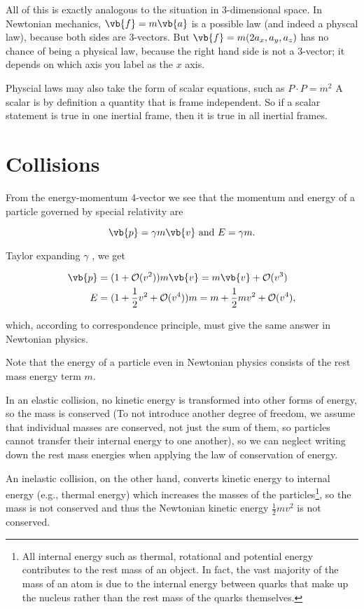 \documentclass[english,a4paper,12pt]{report}
\begin{document}
All of this is exactly analogous to the situation in 3-dimensional space. In Newtonian mechanics, \(\vb{f}  = m\vb{a} \) is a possible law (and indeed a physcal law), because both sides are 3-vectors. But \(\vb{f} = m(2a_{x}, a_{y},a_{z})\) has no chance of being a physical law, because the right hand side is not a 3-vector; it depends on which axis you label as the \(x\) axis.

Physcial laws may also take the form of scalar equations, such as \(P \cdot P = m^2\) A scalar is by definition a quantity that is frame independent. So if a scalar statement is true in one inertial frame, then it is true in all inertial frames.  

\section{Collisions}

From the energy-momentum 4-vector we see that the momentum and energy of a particle governed by special relativity are

\begin{equation}
    \vb{p}  = \gamma m\vb{v} \text { and } E = \gamma m.
\end{equation}

Taylor expanding \(\gamma \) , we get

\begin{equation}
    \begin{aligned}
    \vb{p} &= (1 + \mathcal{O}(v^2)) m\vb{v} = m\vb{v} + \mathcal{O}(v^3 ) \\
    E &= (1 + \frac{1}{2}v^2 + \mathcal{O}(v^{4} ) ) m = m + \frac{1}{2}mv^2 + \mathcal{O}(v^{4} ), 
    \end{aligned}
\end{equation}

which, according to correspondence principle, must give the same answer in Newtonian physics. 

Note that the energy of a particle even in Newtonian physics consists of the rest mass energy term \(m\).  

In an elastic collision, no kinetic energy is transformed into other forms of energy, so the mass is conserved (To not introduce another degree of freedom, we assume that individual masses are conserved, not just the sum of them, so particles cannot transfer their internal energy to one another), so we can neglect writing down the rest mass energies when applying the law of conservation of energy.

An inelastic collision, on the other hand, converts kinetic energy to internal energy (e.g., thermal energy) which increases the masses of the particles\footnote{All internal energy such as thermal, rotational and potential energy contributes to the rest mass of an object. In fact, the vast majority of the mass of an atom is due to the internal energy between quarks that make up the nucleus rather than the rest mass of the quarks themselves.}, so the mass is not conserved and thus the Newtonian kinetic energy \(\frac{1}{2}mv^2\) is not conserved. 
\end{document}
